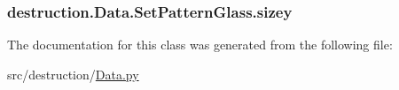 \hypertarget{classdestruction_1_1_data_1_1_set_pattern_glass_a8a548da1ce24ce19b3bc30b8c67a8e3b}{
\subsubsection[{sizey}]{\setlength{\rightskip}{0pt plus 5cm}destruction.\-Data.\-Set\-Pattern\-Glass.\-sizey}}\label{classdestruction_1_1_data_1_1_set_pattern_glass_a8a548da1ce24ce19b3bc30b8c67a8e3b}


The documentation for this class was generated from the following file\-:\begin{DoxyCompactItemize}
\item 
src/destruction/\hyperlink{_data_8py}{Data.\-py}\end{DoxyCompactItemize}

